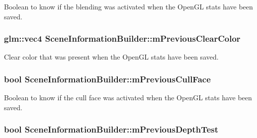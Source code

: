 Boolean to know if the blending was activated when the Open\+G\+L stats have been saved. 

\hypertarget{class_scene_information_builder_afff100c33a051ac01f73a739abd2314e}{
\subsubsection[{m\+Previous\+Clear\+Color}]{\setlength{\rightskip}{0pt plus 5cm}glm\+::vec4 Scene\+Information\+Builder\+::m\+Previous\+Clear\+Color\hspace{0.3cm}{\ttfamily [protected]}}}\label{class_scene_information_builder_afff100c33a051ac01f73a739abd2314e}


Clear color that was present when the Open\+G\+L stats have been saved. 

\hypertarget{class_scene_information_builder_a83501bf9a5b53701143dabddcdfe6a4f}{
\subsubsection[{m\+Previous\+Cull\+Face}]{\setlength{\rightskip}{0pt plus 5cm}bool Scene\+Information\+Builder\+::m\+Previous\+Cull\+Face\hspace{0.3cm}{\ttfamily [protected]}}}\label{class_scene_information_builder_a83501bf9a5b53701143dabddcdfe6a4f}


Boolean to know if the cull face was activated when the Open\+G\+L stats have been saved. 

\hypertarget{class_scene_information_builder_a6ae6c9855481df0c98d6d06d71a20a25}{
\subsubsection[{m\+Previous\+Depth\+Test}]{\setlength{\rightskip}{0pt plus 5cm}bool Scene\+Information\+Builder\+::m\+Previous\+Depth\+Test\hspace{0.3cm}{\ttfamily [protected]}}}\label{class_scene_information_builder_a6ae6c9855481df0c98d6d06d71a20a25}


